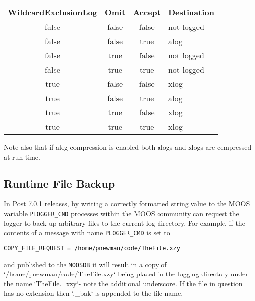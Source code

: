 \documentclass[a4paper,10pt]{article}
\newcommand{\Code}[1]{\texttt{#1} }
\newcommand{\code}[1]{\Code{#1} }
\newcommand{\DB}   {\code{{MOOSDB}}}
\begin{document}
\begin{center}
  \begin{tabular}{ |c|c|c|l| }
    \hline
    WildcardExclusionLog & Omit & Accept & Destination \\ 
    \hline
    false & false & false & not logged \\ 
    false & false & true & alog\\ 
    false & true & false& not logged\\ 
    false & true & true & not logged \\ 
    true & false & false & xlog\\ 
    true & false & true & alog \\ 
    true & true & false & xlog \\ 
    true & true & true & xlog\\ 
    \hline
  \end{tabular}
\end{center}


Note also that if alog compression is enabled both alogs and xlogs are compressed at run time.


\subsection{Runtime File Backup}
In Post 7.0.1 releases, by writing a correctly formatted string value to the MOOS variable \code{PLOGGER\_CMD} processes within the MOOS community can request the logger to back up arbitrary files to the current log directory. For example, if the contents of a message with name \code{PLOGGER\_CMD} is set to
\begin{center}
\code{COPY\_FILE\_REQUEST = /home/pnewman/code/TheFile.xzy}
\end{center}
 and published to the \DB  it will result in a copy of `/home/pnewman/code/TheFile.xzy` being placed in the logging directory under the name `TheFile.\_xzy`- note the additional underscore. If the file in question has no extension then `.\_bak` is appended to the file name.
\end{document}
